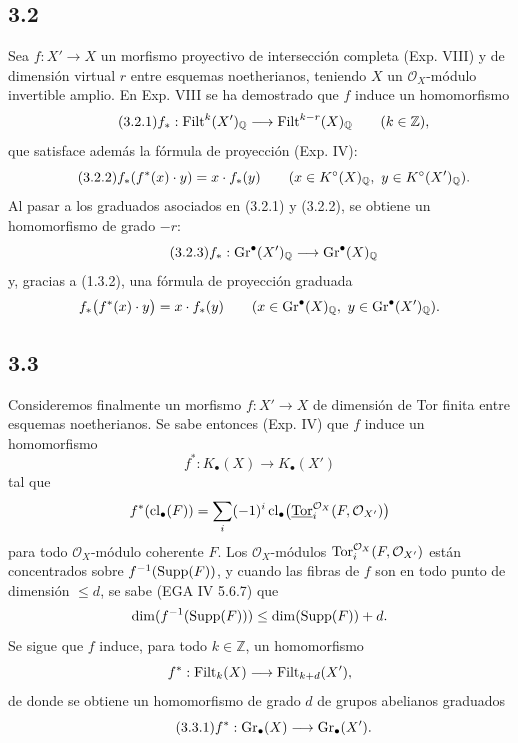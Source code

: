 \subsection*{3.2}
Sea \(f:X'\to X\) un morfismo proyectivo de intersección completa (Exp. VIII)
y de dimensión virtual \(r\) entre esquemas noetherianos, teniendo \(X\) un
\(\mathcal O_X\)-módulo invertible amplio. En Exp. VIII se ha demostrado que
\(f\) induce un homomorfismo
\begin{equation}\tag{3.2.1}
 f_*:\operatorname{Filt}^k(X')_{\mathbb Q}\longrightarrow\operatorname{Filt}^{k-r}(X)_{\mathbb Q}\qquad(k\in\mathbb Z),
\end{equation}
que satisface además la fórmula de proyección (Exp. IV):
\begin{equation}\tag{3.2.2}
 \sisi{f_*((f^*(x)\cdot y)=x\cdot f_*(Y)}{f_*(f^*(x)\cdot y)=x\cdot f_*(y)} %
 \qquad (x\in K^\circ(X)_{\mathbb Q},\ y\in K^\circ(X')_{\mathbb Q}).
\end{equation}
Al pasar a los graduados asociados en (3.2.1) y (3.2.2), se obtiene un
homomorfismo de grado \(-r\):
\begin{equation}\tag{3.2.3}
 f_*:\operatorname{Gr}^{\bullet}(X')_{\mathbb Q}\longrightarrow\operatorname{Gr}^{\bullet}(X)_{\mathbb Q}
\end{equation}
y, gracias a (1.3.2), una fórmula de proyección graduada
\[
 f_*\bigl(f^*(x)\cdot y\bigr)=x\cdot f_*(y)
 \qquad (x\in\operatorname{Gr}^{\bullet}(X)_{\mathbb Q},\ y\in\operatorname{Gr}^{\bullet}(X')_{\mathbb Q}).
\]

\subsection*{3.3}
Consideremos finalmente un morfismo \(f:X'\to X\) de dimensión de Tor finita
entre esquemas noetherianos. Se sabe entonces (Exp. IV) que \(f\) induce un
homomorfismo
\[
 f^*:K_\bullet(X)\longrightarrow K_\bullet(X')
\]
tal que
\[
 f^*(\operatorname{cl}_\bullet(F))=
 \sum_i(-1)^i\operatorname{cl}_\bullet\bigl(\underline{\operatorname{Tor}}_i^{\mathcal O_X}(F,\mathcal O_{X'})\bigr)
\]
para todo \(\mathcal O_X\)-módulo coherente \(F\). Los
\(\mathcal O_X\)-módulos
\(\operatorname{Tor}_i^{\mathcal O_X}(F,\mathcal O_{X'})\) están concentrados sobre
\(f^{-1}(\operatorname{Supp}(F))\), y cuando las fibras de \(f\) son en todo punto de
dimensión \(\leq d\), se sabe (EGA IV 5.6.7) que
\[
 \sisi{\dim(f^{-1}(\Supp(F))}{\dim(f^{-1}(\Supp(F)))}\leq \dim(\Supp(F))+d. %
\]
Se sigue que \(f\) induce, para todo \(k\in\mathbb Z\), un homomorfismo
\[
 f^*:\operatorname{Filt}_k(X)\longrightarrow\operatorname{Filt}_{k+d}(X'),
\]
de donde se obtiene un homomorfismo de grado \(d\) de grupos abelianos
graduados
\begin{equation}\tag{3.3.1}
 f^*:\operatorname{Gr}_{\bullet}(X)\longrightarrow\operatorname{Gr}_{\bullet}(X').
\end{equation}

